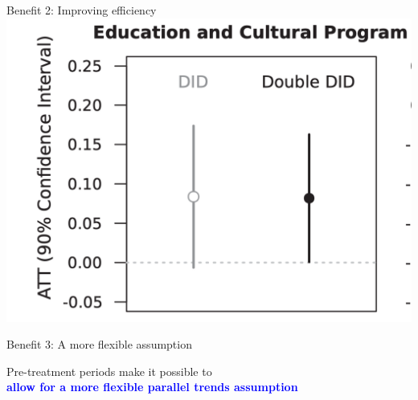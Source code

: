 \documentclass{beamer}
\newcommand\bblue[1]{\textcolor{blue}{\textbf{#1}}}
\begin{document}
\begin{frame}{Benefit 2: Improving efficiency}
\centering
\includegraphics[width = .5\textwidth]{figures/ey_fig4a}
\end{frame}

\begin{frame}{Benefit 3: A more flexible assumption}

Pre-treatment periods make it possible to\\
\bblue{allow for a more flexible parallel trends assumption}

\end{frame}
\end{document}
